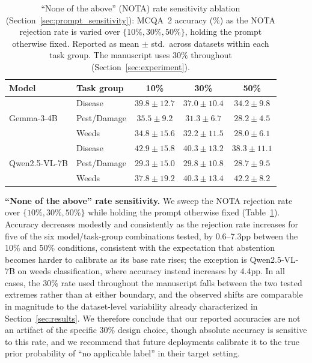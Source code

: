 \documentclass[10pt,letterpaper]{article}
\begin{document}
\begin{table}[t]
\centering
\caption{``None of the above'' (NOTA) rate sensitivity ablation (Section~\ref{sec:prompt_sensitivity}): MCQA~2 accuracy (\%) as the NOTA rejection rate is varied over $\{10\%, 30\%, 50\%\}$, holding the prompt otherwise fixed. Reported as mean $\pm$ std.\ across datasets within each task group. The manuscript uses 30\% throughout (Section~\ref{sec:experiment}).}
\label{tab:ablation_nota}
\renewcommand{\arraystretch}{1.2}
\footnotesize
\begin{tabular}{llccc}
\toprule
\textbf{Model} & \textbf{Task group} & \textbf{10\%} & \textbf{30\%} & \textbf{50\%} \\
\midrule
\multirow{3}{*}{Gemma-3-4B}
    & Disease & $39.8 \pm 12.7$ & $37.0 \pm 10.4$ & $34.2 \pm 9.8$ \\
    & Pest/Damage & $35.5 \pm 9.2$ & $31.3 \pm 6.7$ & $28.2 \pm 4.5$ \\
    & Weeds & $34.8 \pm 15.6$ & $32.2 \pm 11.5$ & $28.0 \pm 6.1$ \\
\midrule
\multirow{3}{*}{Qwen2.5-VL-7B}
    & Disease & $42.9 \pm 15.8$ & $40.3 \pm 13.2$ & $38.3 \pm 11.1$ \\
    & Pest/Damage & $29.3 \pm 15.0$ & $29.8 \pm 10.8$ & $28.7 \pm 9.5$ \\
    & Weeds & $37.8 \pm 19.2$ & $40.3 \pm 13.4$ & $42.2 \pm 8.2$ \\
\bottomrule
\end{tabular}
\end{table}

\textbf{``None of the above'' rate sensitivity.} We sweep the NOTA rejection rate over $\{10\%, 30\%, 50\%\}$ while holding the prompt otherwise fixed (Table~\ref{tab:ablation_nota}). Accuracy decreases modestly and consistently as the rejection rate increases for five of the six model/task-group combinations tested, by 0.6--7.3pp between the 10\% and 50\% conditions, consistent with the expectation that abstention becomes harder to calibrate as its base rate rises; the exception is Qwen2.5-VL-7B on weeds classification, where accuracy instead increases by 4.4pp. In all cases, the 30\% rate used throughout the manuscript falls between the two tested extremes rather than at either boundary, and the observed shifts are comparable in magnitude to the dataset-level variability already characterized in Section~\ref{sec:results}. We therefore conclude that our reported accuracies are not an artifact of the specific 30\% design choice, though absolute accuracy is sensitive to this rate, and we recommend that future deployments calibrate it to the true prior probability of ``no applicable label'' in their target setting.
\end{document}
